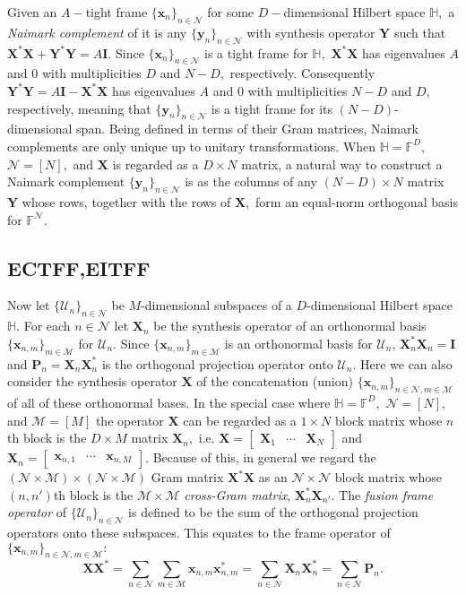 \documentclass[3p,11pt]{elsarticle}
\newcommand{\bbF}{\mathbb{F}}
\newcommand{\bbH}{\mathbb{H}}
\newcommand{\bfI}{\mathbf{I}}
\newcommand{\bfP}{\mathbf{P}}
\newcommand{\bfx}{\mathbf{x}}
\newcommand{\bfX}{\mathbf{X}}
\newcommand{\bfy}{\mathbf{y}}
\newcommand{\bfY}{\mathbf{Y}}
\newcommand{\calM}{\mathcal{M}}
\newcommand{\calN}{\mathcal{N}}
\newcommand{\calU}{\mathcal{U}}
\theoremstyle{definition}
\begin{document}
Given an $A-$tight frame $\{\bfx_n\}_{n\in\calN}$ for some $D-$dimensional Hilbert space $\bbH,$ a \textit{Naimark complement} of it is any $\{\bfy_n\}_{n\in\calN}$ with synthesis operator $\bfY$ such that $\bfX^*\bfX+\bfY^*\bfY=A\bfI.$ Since $\{\bfx_n\}_{n\in\calN}$ is a tight frame for $\bbH,$ $\bfX^*\bfX$ has eigenvalues $A$ and $0$ with multiplicities $D$ and $N-D,$ respectively. Consequently $\bfY^*\bfY=A\bfI-\bfX^*\bfX$ has eigenvalues $A$ and $0$ with multiplicities $N-D$ and $D,$ respectively, meaning that $\{\bfy_n\}_{n\in\calN}$ is a tight frame for its $(N-D)$-dimensional span. Being defined in terms of their Gram matrices, Naimark complements are only unique up to unitary transformations. When $\bbH=\bbF^D,$ $\calN=[N],$ and $\bfX$ is regarded as a $D\times N$ matrix, a natural way to construct a Naimark complement $\{\bfy_n\}_{n\in\calN}$ is as the columns of any $(N-D)\times N$ matrix $\bfY$ whose rows, together with the rows of $\bfX,$ form an equal-norm orthogonal basis for $\bbF^\calN.$

\subsection{ECTFF,EITFF}

Now let $\{\calU_n\}_{n\in\calN}$ be $M$-dimensional subspaces of a $D$-dimensional Hilbert space $\bbH.$ For each $n\in\calN$ let $\bfX_n$ be the synthesis operator of an orthonormal basis $\{\bfx_{n,m}\}_{m\in\calM}$ for $\calU_n.$ Since $\{\bfx_{n,m}\}_{m\in\calM}$ is an orthonormal basis for $\calU_n$, $\bfX_n^*\bfX_n^{}=\bfI$ and $\bfP_n^{}=\bfX_n^{}\bfX_n^*$ is the orthogonal projection operator onto $\calU_n.$ Here we can also consider the synthesis operator $\bfX$ of the concatenation (union) $\{\bfx_{n,m}\}_{n\in\calN,m\in\calM}$ of all of these orthonormal bases. In the special case where $\bbH=\bbF^D,$ $\calN=[N],$ and $\calM=[M]$  the operator $\bfX$ can be regarded as a $1\times N$ block matrix whose $n$th block is the $D\times M$ matrix $\bfX_n,$ i.e. $\bfX=\left[\begin{array}{ccc}\bfX_1 & \cdots & \bfX_N \end{array}\right]$ and $\bfX_n=\left[\begin{array}{ccc}\bfx_{n,1} & \cdots & \bfx_{n,M} \end{array}\right].$ Because of this, in general we regard the $(\calN\times\calM)\times(\calN\times\calM)$ Gram matrix $\bfX^*\bfX$ as an $\calN\times\calN$ block matrix whose $(n,n')$th block is the $\calM\times\calM$ \textit{cross-Gram matrix}, $\bfX_n^*\bfX_{n'}^{}$. The \textit{fusion frame operator} of $\{\calU_n\}_{n\in\calN}$ is defined to be the sum of the orthogonal projection operators onto these subspaces. This equates to the frame operator of $\{\bfx_{n,m}\}_{n\in\calN,m\in\calM}:$ 
\begin{equation}
    \bfX\bfX^*=\sum_{n\in\calN}\sum_{m\in\calM}\bfx_{n,m}^{}\bfx_{n,m}^*=\sum_{n\in\calN}\bfX_n^{}\bfX_n^*=\sum_{n\in\calN}\bfP_n.
\end{equation}
\end{document}
